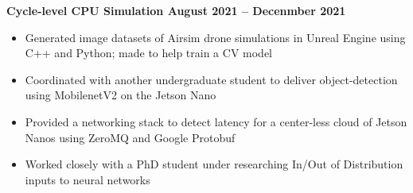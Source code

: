 \documentclass[../main.tex]{subfiles}
\begin{document}
\noindent\textbf{{\fontsize{12}{14}\selectfont Cycle-level CPU Simulation \hfill August 2021 – Decenmber 2021}}\newline
\vspace{-\topsep}
\begin{itemize}
  \setlength{\itemindent}{-6mm}
  \vspace{\listItemDist}\item Generated image datasets of Airsim drone simulations in Unreal Engine using C++ and Python; made to help train a CV model
  \vspace{\listItemDist}\item Coordinated with another undergraduate student to deliver object-detection using MobilenetV2 on the Jetson Nano
  \vspace{\listItemDist}\item Provided a networking stack to detect latency for a center-less cloud of Jetson Nanos using ZeroMQ and Google Protobuf
  \vspace{\listItemDist}\item Worked closely with a PhD student under researching In/Out of Distribution inputs to neural networks
\end{itemize}
\end{document}
